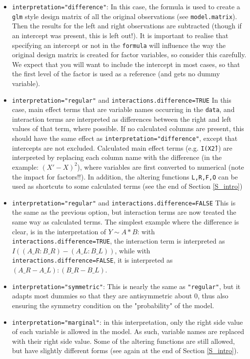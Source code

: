 \documentclass[12pt]{article}
\newcommand{\cd}[1]{\texttt{#1}}%
\begin{document}
\begin{itemize}
	\item {\cd{interpretation="difference"}}: In this case, the formula is used to create a \cd{glm} style design matrix of all the original observations (see \cd{model.matrix}). Then the results for the left and right observations are subtracted (though if an intercept was present, this is left out!). It is important to realise that specifying an intercept or not in the \cd{formula} will influence the way the original design matrix is created for factor variables, so consider this carefully. We expect that you will want to include the intercept in most cases, so that the first level of the factor is used as a reference (and gets no dummy variable).
	\item {\cd{interpretation="regular"} and \cd{interactions.difference=TRUE}} In this case, main effect terms that are variable names occurring in the \cd{data}, and interaction terms are interpreted as differences between the right and left values of that term, where possible. If no calculated columns are present, this should have the same effect as \cd{interpretation="difference"}, except that intercepts are not excluded. Calculated main effect terms (e.g. \cd{I(X\^2)}) are interpreted by replacing each column name with the difference (in the example: \cd{$(X'-X)^2$}), where variables are first converted to numerical (note the impact for factors!!). In addition, the altering functions \cd{L,R,F,O} can be used as shortcuts to some calculated terms (see the end of Section \ref{S_intro})
	\item {\cd{interpretation="regular"} and \cd{interactions.difference=FALSE}} This is the same as the previous option, but interaction terms are now treated the same way as calculated terms. The simplest example where the difference is clear, is in the interpretation of $Y\sim A*B$: with \cd{interactions.difference=TRUE}, the interaction term is interpreted as $I((A\_R:B\_R)-(A\_L:B\_L))$, while with \cd{interactions.difference=FALSE}, it is interpreted as $(A\_R-A\_L):(B\_R-B\_L)$.
	\item {\cd{interpretation="symmetric"}: This is nearly the same as \cd{"regular"}, but it adapts most dummies so that they are antisymmetric about 0, thus also ensuring the symmetry condition on the "probability" of the model.}
	\item {\cd{interpretation="marginal"}}: in this interpretation, only the right side value of each variable is allowed in the model. As such, variable names are replaced with their right side value. Some of the altering functions are still allowed, but have slightly different forms (see again at the end of Section \ref{S_intro}).
\end{itemize}
\end{document}
